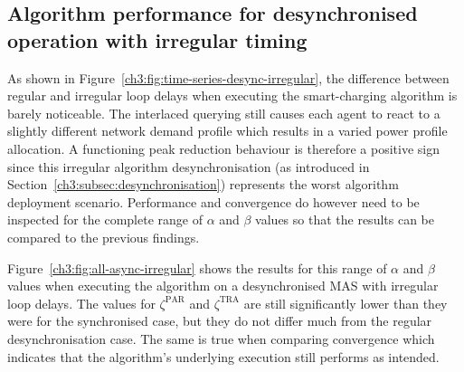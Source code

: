 \subsection{Algorithm performance for desynchronised operation with irregular timing}
\label{ch3:subsec:algorithm-performance-desynchronised-irregular}



As shown in Figure~\ref{ch3:fig:time-series-desync-irregular}, the difference between regular and irregular loop delays when executing the smart-charging algorithm is barely noticeable.
The interlaced querying still causes each agent to react to a slightly different network demand profile which results in a varied power profile allocation.
A functioning peak reduction behaviour is therefore a positive sign since this irregular algorithm desynchronisation (as introduced in Section~\ref{ch3:subsec:desynchronisation}) represents the worst algorithm deployment scenario.
Performance and convergence do however need to be inspected for the complete range of $\alpha$ and $\beta$ values so that the results can be compared to the previous findings.



Figure~\ref{ch3:fig:all-async-irregular} shows the results for this range of $\alpha$ and $\beta$ values when executing the algorithm on a desynchronised MAS with irregular loop delays.
The values for $\zeta^\text{PAR}$ and $\zeta^\text{TRA}$ are still significantly lower than they were for the synchronised case, but they do not differ much from the regular desynchronisation case.
The same is true when comparing convergence which indicates that the algorithm's underlying execution still performs as intended.
